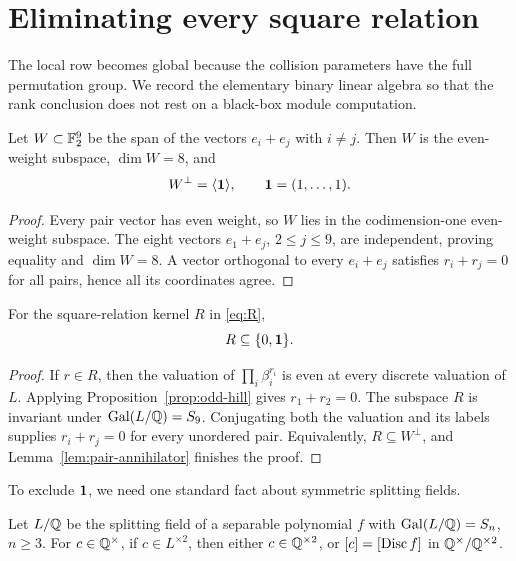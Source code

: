 \section{Eliminating every square relation}

The local row becomes global because the collision parameters have the
full permutation group.  We record the elementary binary linear algebra so
that the rank conclusion does not rest on a black-box module computation.

\begin{lemma}\label{lem:pair-annihilator}
Let \(W\subset\mathbb{F}_2^9\) be the span of the vectors \(e_i+e_j\) with
\(i\ne j\).  Then \(W\) is the even-weight subspace, \(\dim W=8\), and
\[
 W^\perp=\langle\mathbf{1}\rangle,
 \qquad \mathbf{1}=(1,\ldots,1).
\]
\end{lemma}

\begin{proof}
Every pair vector has even weight, so \(W\) lies in the codimension-one
even-weight subspace.  The eight vectors \(e_1+e_j\), \(2\le j\le9\),
are independent, proving equality and \(\dim W=8\).  A vector orthogonal
to every \(e_i+e_j\) satisfies \(r_i+r_j=0\) for all pairs, hence all its
coordinates agree.
\end{proof}

\begin{proposition}\label{prop:one-relation}
For the square-relation kernel \(R\) in \eqref{eq:R},
\[
 R\subseteq\{0,\mathbf{1}\}.
\]
\end{proposition}

\begin{proof}
If \(r\in R\), then the valuation of
\(\prod_i\beta_i^{r_i}\) is even at every discrete valuation of \(L\).
Applying Proposition~\ref{prop:odd-hill} gives
\(r_1+r_2=0\).  The subspace \(R\) is invariant under
\(\operatorname{Gal}(L/\mathbb{Q})=S_9\).  Conjugating both the valuation and its labels supplies
\(r_i+r_j=0\) for every unordered pair.  Equivalently, \(R\subseteq
W^\perp\), and Lemma~\ref{lem:pair-annihilator} finishes the proof.
\end{proof}

To exclude \(\mathbf{1}\), we need one standard fact about symmetric splitting
fields.

\begin{lemma}\label{lem:sign-field}
Let \(L/\mathbb{Q}\) be the splitting field of a separable polynomial \(f\) with
\(\operatorname{Gal}(L/\mathbb{Q})=S_n\), \(n\ge3\).  For \(c\in\mathbb{Q}^\times\), if
\(c\in L^{\times2}\), then either \(c\in\mathbb{Q}^{\times2}\), or
\(\left[c\right]=\left[\operatorname{Disc} f\right]\) in \(\mathbb{Q}^\times/\mathbb{Q}^{\times2}\).
\end{lemma}

